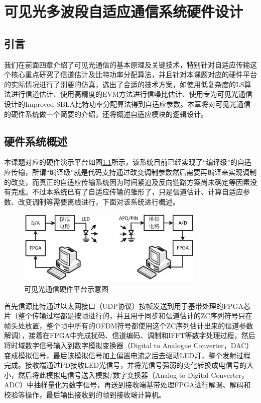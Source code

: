 \chapter{可见光多波段自适应通信系统硬件设计}
\section{引言}
我们在前面四章介绍了可见光通信的基本原理及关键技术，特别针对自适应传输这个核心重点研究了信道估计及比特功率分配算法，并且针对本课题对应的硬件平台的实际情况进行了别要的仿真，选出了合适的技术方案，如使用低复杂度的LS算法进行信道估计、使用高精度的EVM方法进行信噪比估计、使用专为可见光通信设计的Improved-SBLA比特功率分配算法得到自适应参数。本章将对可见光通信的硬件系统做一个简要的介绍，还将概述自适应模块的逻辑设计。
\section{硬件系统概述}
本课题对应的硬件演示平台如图\ref{fig:Hardware_Structure}所示，该系统目前已经实现了“编译级”的自适应传输，所谓“编译级”就是代码支持通过改变调制参数然后需要再编译来实现调制的改变，而真正的自适应传输系统因为时间紧迫及反向链路方案尚未确定等因素没有完成。不过本系统已有了自适应传输的雏形了，只是信道估计、计算自适应参数、改变调制等需要离线进行，下面对该系统进行概述。
\begin{figure}[htbp] 
\centering
\includegraphics[width=0.8\textwidth]{figures/chapter-5/Hardware_Structure.eps}
\caption{可见光通信硬件平台示意图}
\label{fig:Hardware_Structure}
\end{figure}

首先信源比特通过以太网接口（UDP协议）按帧发送到用于基带处理的FPGA芯片（整个传输过程都是按帧进行的，并且用于同步和信道估计的ZC序列符号只在帧头处放置，整个帧中所有的OFDM符号都使用这个ZC序列估计出来的信道参数解调），接着在FPGA中完成扰码、信道编码、调制和IFFT等数字处理过程，然后将时域数字信号输入到数字模拟变换器（Digital to Analogue Converter，DAC）变成模拟信号，最后该模拟信号加上偏置电流之后去驱动LED灯，整个发射过程完成。接收端通过PD接收LED光信号，并将光信号强弱的变化转换成电信号的大小，然后将此模拟电信号送入模拟/数字变换器（Analog to Digital Converter，ADC）中抽样量化为数字信号，再送到接收端基带处理FPGA进行解调、解码和校验等操作，最后输出接收到的帧到接收端计算机。
